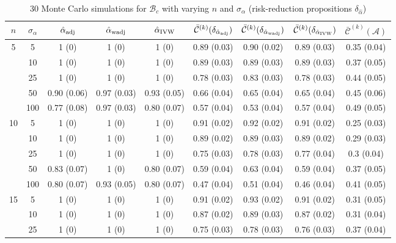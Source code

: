\documentclass[11pt]{article}
\def\mc#1{\mathcal{#1}} %
\theoremstyle{definition}
\begin{document}
\begin{table}[t]
\caption{30 Monte Carlo simulations for $\mc{B}_c$ with varying $n$ and $\sigma_{\alpha}$ (risk-reduction propositions $\delta_{\hat{\alpha}}$)} \vspace{.2cm} \label{table1}
\begin{center}
\begin{tabular}{cc|ccc|cccc}
 $n$   & $\sigma_{\alpha}$ &  $\hat{\alpha}_{\rm adj}$  & $\hat{\alpha}_{\rm wadj}$ & $\hat{\alpha}_{\rm IVW}$  & $\bar{\mc{C}}^{(k)}(\delta_{\hat{\alpha}_{\rm adj}})$  & $\bar{\mc{C}}^{(k)}(\delta_{\hat{\alpha}_{\rm wadj}})$ & $\bar{\mc{C}}^{(k)}(\delta_{\hat{\alpha}_{\rm IVW}})$ &  $\bar{\mc{C}}^{(k)}(\mc{A})$ \\[.15cm]  
  \hline
  \multirow{5}{*}{5} & 5  & 1 (0) & 1 (0) & 1 (0) & 0.89 (0.03) & 0.90 (0.02) & 0.89 (0.03) & 0.35 (0.04) \\ 
  & 10  & 1 (0) & 1 (0) & 1 (0) & 0.89 (0.03) & 0.89 (0.03) & 0.89 (0.03) & 0.37 (0.05) \\ 
  & 25  & 1 (0) & 1 (0) & 1 (0) & 0.78 (0.03) & 0.83 (0.03) & 0.78 (0.03) & 0.44 (0.05) \\ 
  & 50  & 0.90 (0.06) & 0.97 (0.03) & 0.93 (0.05) & 0.66 (0.04) & 0.65 (0.04) & 0.65 (0.04) & 0.45 (0.06) \\ 
  & 100  & 0.77 (0.08) & 0.97 (0.03) & 0.80 (0.07) & 0.57 (0.04) & 0.53 (0.04) & 0.57 (0.04) & 0.49 (0.05) \\[.3cm]  
  \multirow{5}{*}{10} & 5  & 1 (0) & 1 (0) & 1 (0) & 0.91 (0.02) & 0.92 (0.02) & 0.91 (0.02) & 0.25 (0.03) \\ 
  & 10  & 1 (0) & 1 (0) & 1 (0) & 0.89 (0.02) & 0.89 (0.03) & 0.89 (0.02) & 0.29 (0.03) \\ 
  & 25  & 1 (0) & 1 (0) & 1 (0) & 0.75 (0.03) & 0.78 (0.03) & 0.77 (0.04) & 0.3 (0.04) \\ 
  & 50  & 0.83 (0.07) & 1 (0) & 0.80 (0.07) & 0.59 (0.04) & 0.63 (0.04) & 0.59 (0.04) & 0.37 (0.05) \\ 
  & 100  & 0.80 (0.07) & 0.93 (0.05) & 0.80 (0.07) & 0.47 (0.04) & 0.51 (0.04) & 0.46 (0.04) & 0.41 (0.05) \\[.3cm]  
  \multirow{5}{*}{15} & 5  & 1 (0) & 1 (0) & 1 (0) & 0.91 (0.02) & 0.93 (0.02) & 0.91 (0.02) & 0.31 (0.05) \\ 
  & 10  & 1 (0) & 1 (0) & 1 (0) & 0.87 (0.02) & 0.89 (0.03) & 0.87 (0.02) & 0.31 (0.04) \\ 
 & 25  & 1 (0) & 1 (0) & 1 (0) & 0.75 (0.03) & 0.78 (0.03) & 0.76 (0.03) & 0.37 (0.04) \\ 

\end{tabular}
\end{center}
\end{table}
\end{document}
